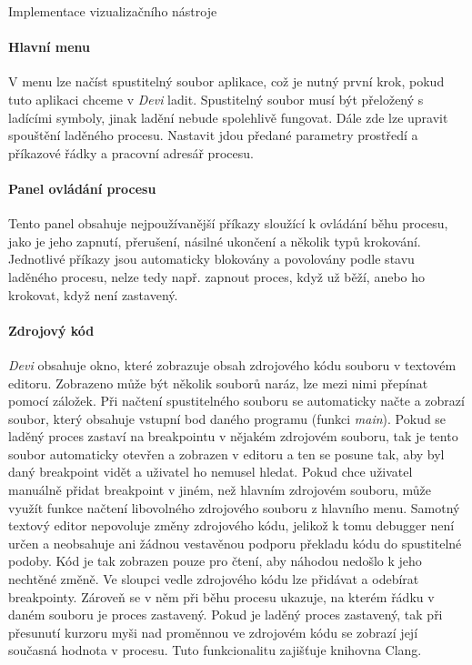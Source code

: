 \documentclass[czech,bachelor,male,python,dept460]{diploma}						%
\begin{document}
\begin{section}{Implementace vizualizačního nástroje}
	
	\paragraph*{Hlavní menu} V menu lze načíst spustitelný soubor aplikace, což je nutný první krok, pokud tuto aplikaci chceme v \textit{Devi} ladit.
		Spustitelný soubor musí být přeložený s ladícími symboly, jinak ladění nebude spolehlivě fungovat. Dále zde lze upravit spouštění laděného procesu.
		Nastavit jdou předané parametry prostředí a příkazové řádky a pracovní adresář procesu.
	\paragraph*{Panel ovládání procesu} Tento panel obsahuje nejpoužívanější příkazy sloužící k ovládání běhu procesu, jako je jeho zapnutí, přerušení, násilné
		ukončení a několik typů krokování. Jednotlivé příkazy jsou automaticky blokovány a povolovány podle stavu laděného procesu, nelze tedy např. zapnout
		proces, když už běží, anebo ho krokovat, když není zastavený.
	\paragraph*{Zdrojový kód} \textit{Devi} obsahuje okno, které zobrazuje obsah zdrojového kódu souboru v textovém editoru. Zobrazeno může být několik souborů naráz,
		lze mezi nimi přepínat pomocí záložek. Při načtení spustitelného souboru se automaticky načte a zobrazí soubor, který obsahuje vstupní bod daného programu
		(funkci \textit{main}). Pokud se laděný proces zastaví na breakpointu v nějakém zdrojovém souboru, tak je tento soubor automaticky otevřen a zobrazen
		v editoru a ten se posune tak, aby byl daný breakpoint vidět a uživatel ho nemusel hledat. Pokud chce uživatel manuálně přidat breakpoint v jiném, než
		hlavním zdrojovém souboru, může využít funkce načtení libovolného zdrojového souboru z hlavního menu. Samotný textový editor nepovoluje změny zdrojového
		kódu, jelikož k tomu debugger není určen a neobsahuje ani žádnou vestavěnou podporu překladu kódu do spustitelné podoby. Kód je tak zobrazen pouze pro
		čtení, aby náhodou nedošlo k jeho nechtěné změně. Ve sloupci vedle zdrojového kódu lze přidávat a odebírat breakpointy. Zároveň se v něm při běhu procesu
		ukazuje, na kterém řádku v daném souboru je proces zastavený. Pokud je laděný proces zastavený, tak při přesunutí kurzoru myši nad proměnnou ve zdrojovém
		kódu se zobrazí její současná hodnota v procesu. Tuto funkcionalitu zajišťuje knihovna Clang.

\end{section}
\end{document}
